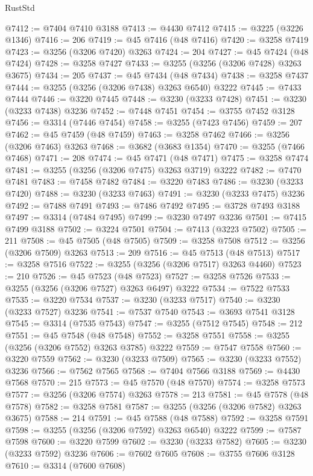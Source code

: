 \begin{lexlean}{RustStd}
\begin{coremodule}
@7412 := @7404 @7410 @3188
@7413 := @4430 @7412
@7415 := @3225 (@3226 @1346)
@7416 := 206
@7419 := @45 @7416 (@48 @7416)
@7420 := @3258 @7419
@7423 := @3256 (@3206 @7420) @3263
@7424 := 204
@7427 := @45 @7424 (@48 @7424)
@7428 := @3258 @7427
@7433 := @3255 (@3256 (@3206 @7428) @3263 @3675)
@7434 := 205
@7437 := @45 @7434 (@48 @7434)
@7438 := @3258 @7437
@7444 := @3255 (@3256 (@3206 @7438) @3263 @6540) @3222
@7445 := @7433 @7444
@7446 := @3220 @7445
@7448 := @3230 (@3233 @7428)
@7451 := @3230 (@3233 @7438) @3236
@7452 := @7448 @7451
@7454 := @3755 @7452 @3128
@7456 := @3314 (@7446 @7454)
@7458 := @3255 (@7423 @7456)
@7459 := 207
@7462 := @45 @7459 (@48 @7459)
@7463 := @3258 @7462
@7466 := @3256 (@3206 @7463) @3263
@7468 := @3682 (@3683 @1354)
@7470 := @3255 (@7466 @7468)
@7471 := 208
@7474 := @45 @7471 (@48 @7471)
@7475 := @3258 @7474
@7481 := @3255 (@3256 (@3206 @7475) @3263 @3719) @3222
@7482 := @7470 @7481
@7483 := @7458 @7482
@7484 := @3220 @7483
@7486 := @3230 (@3233 @7420)
@7488 := @3230 (@3233 @7463)
@7491 := @3230 (@3233 @7475) @3236
@7492 := @7488 @7491
@7493 := @7486 @7492
@7495 := @3728 @7493 @3188
@7497 := @3314 (@7484 @7495)
@7499 := @3230 @7497 @3236
@7501 := @7415 @7499 @3188
@7502 := @3224 @7501
@7504 := @7413 (@3223 @7502)
@7505 := 211
@7508 := @45 @7505 (@48 @7505)
@7509 := @3258 @7508
@7512 := @3256 (@3206 @7509) @3263
@7513 := 209
@7516 := @45 @7513 (@48 @7513)
@7517 := @3258 @7516
@7522 := @3255 (@3256 (@3206 @7517) @3263 @4460)
@7523 := 210
@7526 := @45 @7523 (@48 @7523)
@7527 := @3258 @7526
@7533 := @3255 (@3256 (@3206 @7527) @3263 @6497) @3222
@7534 := @7522 @7533
@7535 := @3220 @7534
@7537 := @3230 (@3233 @7517)
@7540 := @3230 (@3233 @7527) @3236
@7541 := @7537 @7540
@7543 := @3693 @7541 @3128
@7545 := @3314 (@7535 @7543)
@7547 := @3255 (@7512 @7545)
@7548 := 212
@7551 := @45 @7548 (@48 @7548)
@7552 := @3258 @7551
@7558 := @3255 (@3256 (@3206 @7552) @3263 @3785) @3222
@7559 := @7547 @7558
@7560 := @3220 @7559
@7562 := @3230 (@3233 @7509)
@7565 := @3230 (@3233 @7552) @3236
@7566 := @7562 @7565
@7568 := @7404 @7566 @3188
@7569 := @4430 @7568
@7570 := 215
@7573 := @45 @7570 (@48 @7570)
@7574 := @3258 @7573
@7577 := @3256 (@3206 @7574) @3263
@7578 := 213
@7581 := @45 @7578 (@48 @7578)
@7582 := @3258 @7581
@7587 := @3255 (@3256 (@3206 @7582) @3263 @3675)
@7588 := 214
@7591 := @45 @7588 (@48 @7588)
@7592 := @3258 @7591
@7598 := @3255 (@3256 (@3206 @7592) @3263 @6540) @3222
@7599 := @7587 @7598
@7600 := @3220 @7599
@7602 := @3230 (@3233 @7582)
@7605 := @3230 (@3233 @7592) @3236
@7606 := @7602 @7605
@7608 := @3755 @7606 @3128
@7610 := @3314 (@7600 @7608)

\end{coremodule}
\end{lexlean}
